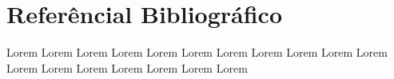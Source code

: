 \section{Referêncial Bibliográfico}

Lorem \cite{appcache01}
Lorem \cite{browserscope}
Lorem \cite{googlesupport}
Lorem \cite{hawkes2011foundation}
Lorem \cite{html5boilerplate}
Lorem \cite{html5mozilla}
Lorem \cite{jogandoeaprendendo}
Lorem \cite{lubbers2010pro}
Lorem \cite{meyer2011essential}
Lorem \cite{nativeapp}
Lorem \cite{newtechnologies2010}
Lorem \cite{pilgrim2010html5}
Lorem \cite{phan2010mobile}
Lorem \cite{powell2003html}
Lorem \cite{souders2007high}
Lorem \cite{souders2009even}
Lorem \cite{w3ccanvas}
Lorem \cite{whatwg01}

%
